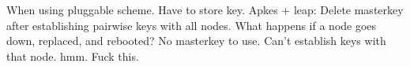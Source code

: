 When using pluggable scheme. Have to store key. Apkes + leap: Delete masterkey after establishing pairwise keys with all nodes. What happens if a node goes down, replaced, and rebooted? No masterkey to use. Can't establish keys with that node. hmm. Fuck this.








